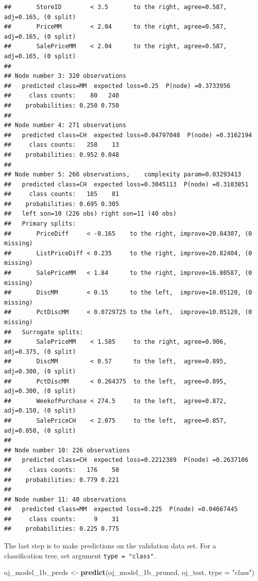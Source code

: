 \documentclass[
]{book}
\newenvironment{Shaded}{\begin{snugshade}}{\end{snugshade}}
\newcommand{\DataTypeTok}[1]{\textcolor[rgb]{0.13,0.29,0.53}{#1}}
\newcommand{\KeywordTok}[1]{\textcolor[rgb]{0.13,0.29,0.53}{\textbf{#1}}}
\newcommand{\NormalTok}[1]{#1}
\newcommand{\StringTok}[1]{\textcolor[rgb]{0.31,0.60,0.02}{#1}}
\begin{document}
\begin{verbatim}
##       StoreID        < 3.5       to the right, agree=0.587, adj=0.165, (0 split)
##       PriceMM        < 2.04      to the right, agree=0.587, adj=0.165, (0 split)
##       SalePriceMM    < 2.04      to the right, agree=0.587, adj=0.165, (0 split)
## 
## Node number 3: 320 observations
##   predicted class=MM  expected loss=0.25  P(node) =0.3733956
##     class counts:    80   240
##    probabilities: 0.250 0.750 
## 
## Node number 4: 271 observations
##   predicted class=CH  expected loss=0.04797048  P(node) =0.3162194
##     class counts:   258    13
##    probabilities: 0.952 0.048 
## 
## Node number 5: 266 observations,    complexity param=0.03293413
##   predicted class=CH  expected loss=0.3045113  P(node) =0.3103851
##     class counts:   185    81
##    probabilities: 0.695 0.305 
##   left son=10 (226 obs) right son=11 (40 obs)
##   Primary splits:
##       PriceDiff     < -0.165    to the right, improve=20.84307, (0 missing)
##       ListPriceDiff < 0.235     to the right, improve=20.82404, (0 missing)
##       SalePriceMM   < 1.84      to the right, improve=16.80587, (0 missing)
##       DiscMM        < 0.15      to the left,  improve=10.05120, (0 missing)
##       PctDiscMM     < 0.0729725 to the left,  improve=10.05120, (0 missing)
##   Surrogate splits:
##       SalePriceMM    < 1.585     to the right, agree=0.906, adj=0.375, (0 split)
##       DiscMM         < 0.57      to the left,  agree=0.895, adj=0.300, (0 split)
##       PctDiscMM      < 0.264375  to the left,  agree=0.895, adj=0.300, (0 split)
##       WeekofPurchase < 274.5     to the left,  agree=0.872, adj=0.150, (0 split)
##       SalePriceCH    < 2.075     to the left,  agree=0.857, adj=0.050, (0 split)
## 
## Node number 10: 226 observations
##   predicted class=CH  expected loss=0.2212389  P(node) =0.2637106
##     class counts:   176    50
##    probabilities: 0.779 0.221 
## 
## Node number 11: 40 observations
##   predicted class=MM  expected loss=0.225  P(node) =0.04667445
##     class counts:     9    31
##    probabilities: 0.225 0.775
\end{verbatim}

The last step is to make predictions on the validation data set. For a classification tree, set argument \texttt{type\ =\ "class"}.

\begin{Shaded}
\begin{Highlighting}[]
\NormalTok{oj_model_1b_preds <-}\StringTok{ }\KeywordTok{predict}\NormalTok{(oj_model_1b_pruned, oj_test, }\DataTypeTok{type =} \StringTok{"class"}\NormalTok{)}
\end{Highlighting}
\end{Shaded}
\end{document}
